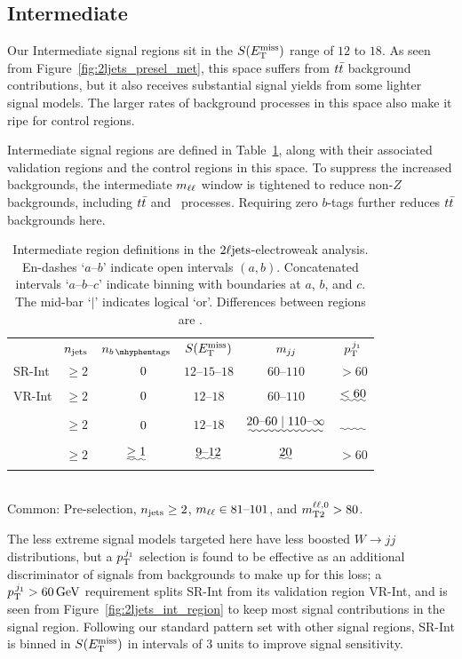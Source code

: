 \subsection{Intermediate}
\label{sec:2ljets_int}
Our Intermediate signal regions sit in the $\metsig$ range of
$12$ to $18$.
As seen from Figure~\ref{fig:2ljets_presel_met}, this space suffers from
$\ttbar$ background contributions, but it also receives substantial signal
yields from some lighter signal models.
The larger rates of background processes in this space also make it ripe for
control regions.

Intermediate signal regions are defined in Table~\ref{tab:2ljets_int},
along with their associated validation regions and the control regions in this
space.
To suppress the increased backgrounds, the intermediate $\mll$ window is
tightened to reduce non-$Z$ backgrounds, including $\ttbar$ and \diboson\
processes.
Requiring zero $b$-tags further reduces $\ttbar$ backgrounds here.

\begin{table}[tp]
\centering
\begin{tabular}{lccccc}
& $\njet$
& $\nbtag$
& $\metsig$
& $\mjj$
& $\ptjone$
\\[1em]
SR-Int
& $\geq 2$
& $\hphantom{\geq}~0$
& $12\textrm{--}15\textrm{--}18$
& $60\textrm{--}110$
& $> 60$
\\[0.5em]
\: VR-Int
& $\geq 2$
& $\hphantom{\geq}~0$
& $12\textrm{--}18$
& $60\textrm{--}110$
& $\uwave{< 60}$
\\[1em]
\crvz
& $\geq 2$
& $\hphantom{\geq}~0$
& $12\textrm{--}18$
& $\uwave{20\textrm{--}60 \mid 110\textrm{--}\infty}$
& $\uwave{\hphantom{< 60}}$
\\[0.5em]
\crtt
& $\geq 2$
& $\uwave{\geq 1}$
& $\uwave{9\textrm{--}12}$
& $\uwave{20}$
& $> 60$
\end{tabular}
\\[1em]
Common: Pre-selection,
$\njet \geq 2$,
$\mll \in 81\textrm{--}101$, and
$\mttwoll > 80$.
\caption[
Intermediate region definitions in the $\twoljets$-electroweak analysis
]{%
Intermediate region definitions in the $\twoljets$-electroweak analysis.
En-dashes `$a\textrm{--}b$' indicate open intervals $(a, b)$.
Concatenated intervals `$a\textrm{--}b\textrm{--}c$' indicate binning
with boundaries at $a$, $b$, and $c$.
The mid-bar `$\mid$' indicates logical `or'.
Differences between regions are .
}
\label{tab:2ljets_int}
\end{table}

The less extreme signal models targeted here have less boosted
$W\to jj$ distributions, but a $\ptjone$ selection is found to be
effective as an additional discriminator of signals from backgrounds to make
up for this loss;
a $\ptjone > 60\,\eV[G]$ requirement splits SR-Int from its validation region
VR-Int, and is seen from Figure~\ref{fig:2ljets_int_region} to keep most
signal contributions in the signal region.
Following our standard pattern set with other signal regions, SR-Int is binned
in $\metsig$ in intervals of $3$ units to improve signal sensitivity.

